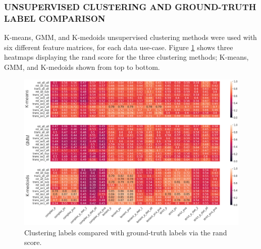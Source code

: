 \documentclass{ieeeaccess}
\begin{document}
\subsubsection{UNSUPERVISED CLUSTERING AND GROUND-TRUTH  LABEL COMPARISON}
K-means, GMM, and K-medoids unsupervised clustering methods were used with six different feature matrices, for each data use-case. Figure \ref{fig8} shows three heatmaps displaying the rand score for the three clustering methods; K-means, GMM, and K-medoids shown from top to bottom.
\begin{figure}[htp]
\begin{center}
\includegraphics[width=1.0\linewidth]{figures/figure8_1.eps}
\end{center}
\caption{Clustering labels compared with ground-truth labels via the rand score.}
\label{fig8}
\end{figure}
\end{document}
